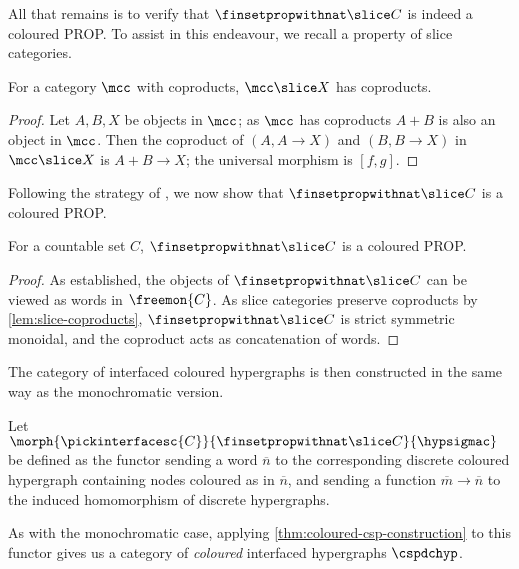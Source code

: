 All that remains is to verify that \(\finsetpropwithnat \slice C\) is indeed a
coloured PROP.
To assist in this endeavour, we recall a property of slice categories.

\begin{lemma}\label{lem:slice-coproducts}
    For a category \(\mcc\) with coproducts, \(\mcc \slice X\) has coproducts.
\end{lemma}
\begin{proof}
    Let \(A,B,X\) be objects in \(\mcc\); as \(\mcc\) has coproducts \(A + B\)
    is also an object in \(\mcc\).
    Then the coproduct of \((A, A \to X)\) and \((B, B \to X)\) in
    \(\mcc \slice X\) is \(A + B \to X\); the universal morphism is \([f, g]\).
\end{proof}

Following the strategy of \cite[Prop.\ 2.23]{bonchi2022string}, we now show
that \(\finsetpropwithnat \slice C\) is a coloured PROP.

\begin{proposition}\label{prop:hatfinsetprop-slice-is-coloured-prop}
    For a countable set \(C\), \(\finsetpropwithnat \slice C\) is a
    coloured PROP.
\end{proposition}
\begin{proof}
    As established, the objects of \(\finsetpropwithnat \slice C\) can be viewed
    as words in \(\freemon{C}\).
    As slice categories preserve coproducts by \cref{lem:slice-coproducts},
    \(\finsetpropwithnat \slice C\) is strict symmetric monoidal, and the
    coproduct acts as concatenation of words.
\end{proof}

The category of interfaced coloured hypergraphs is then constructed in the same
way as the monochromatic version.

\begin{definition}
    Let \(\morph{\pickinterfacesc{C}}{\finsetpropwithnat \slice C}{\hypsigmac}\)
    be defined as the functor sending a word \(\overline{n}\) to the
    corresponding discrete coloured hypergraph containing nodes coloured as
    in \(\overline{n}\), and sending a function \(\overline{m} \to \overline{n}\)
    to the induced homomorphism of discrete hypergraphs.
\end{definition}

As with the monochromatic case, applying \cref{thm:coloured-csp-construction} to
this functor gives us a category of \emph{coloured} interfaced hypergraphs
\(\cspdchyp\).

